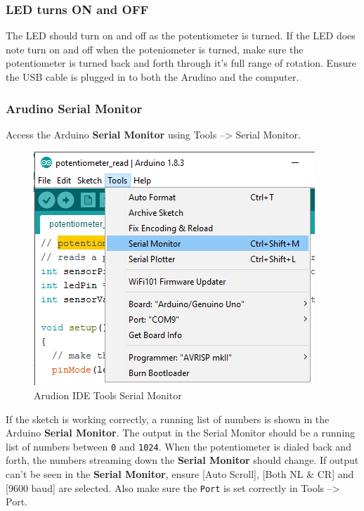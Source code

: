 \documentclass{book}
\makeatletter
\def\maxwidth{\ifdim\Gin@nat@width>\linewidth\linewidth
    \else\Gin@nat@width\fi}
\let\Oldincludegraphics\includegraphics
\renewcommand{\includegraphics}[1]{\Oldincludegraphics[width=.8\maxwidth]{#1}}
\makeatother
\begin{document}
    \subsubsection{LED turns ON and OFF}\label{led-turns-on-and-off}

The LED should turn on and off as the potentiometer is turned. If the
LED does note turn on and off when the poteniometer is turned, make sure
the potentiometer is turned back and forth through it's full range of
rotation. Ensure the USB cable is plugged in to both the Arudino and the
computer.

    \subsubsection{Arudino Serial Monitor}\label{arudino-serial-monitor}

Access the Arduino \textbf{Serial Monitor} using Tools --\textgreater{}
Serial Monitor.

\begin{figure}
\centering
\includegraphics{images/Tools_SerialMonitor.png}
\caption{Arudion IDE Tools Serial Monitor}
\end{figure}

    If the sketch is working correctly, a running list of numbers is shown
in the Arduino \textbf{Serial Monitor}. The output in the Serial Monitor
should be a running list of numbers between \lstinline!0! and
\lstinline!1024!. When the potentiometer is dialed back and forth, the
numbers streaming down the \textbf{Serial Monitor} should change. If
output can't be seen in the \textbf{Serial Monitor}, ensure {[}Auto
Scroll{]}, {[}Both NL \& CR{]} and {[}9600 baud{]} are selected. Also
make sure the \lstinline!Port! is set correctly in Tools
--\textgreater{} Port.
\end{document}
